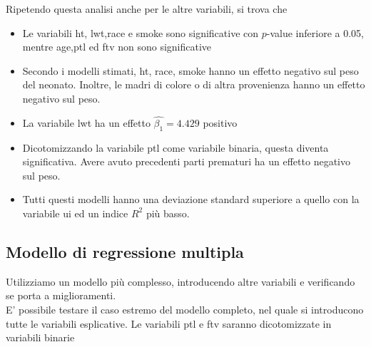 \documentclass{article}\usepackage[]{graphicx}\usepackage[]{color}
\begin{document}
Ripetendo questa analisi anche per le altre variabili, si trova che
\begin{itemize}
\item Le variabili ht, lwt,race e smoke sono significative con $p$-value inferiore a 0.05, mentre age,ptl ed ftv non sono significative
\item Secondo i modelli stimati, ht, race, smoke hanno un effetto negativo sul peso del neonato. Inoltre, le madri di colore o di altra provenienza hanno un effetto negativo sul peso.
\item La variabile lwt ha un effetto $\hat{\beta_1} =  4.429 $ positivo
\item Dicotomizzando la variabile ptl come variabile binaria, questa diventa significativa. Avere avuto precedenti parti prematuri ha un effetto negativo sul peso.
\item Tutti questi modelli hanno una deviazione standard superiore a quello con la variabile ui ed un indice $R^2$ più basso.
\end{itemize}

\subsection{Modello di regressione multipla}
\label{sub:reg_multipla}
Utilizziamo un modello più complesso, introducendo altre variabili e verificando se porta a miglioramenti.\\
E' possibile testare il caso estremo del modello completo, nel quale si introducono tutte le variabili esplicative. Le variabili ptl e ftv saranno dicotomizzate in variabili binarie
\end{document}
